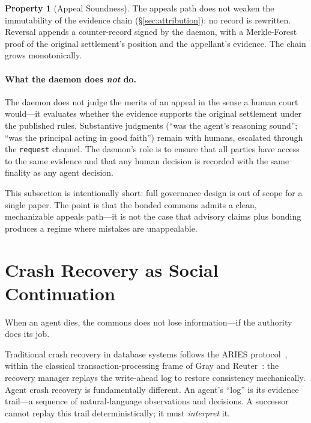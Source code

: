 \documentclass[11pt,a4paper]{article}
\theoremstyle{definition}
\newtheorem{property}{Property}[section]
\theoremstyle{remark}
\begin{document}
\begin{property}[Appeal Soundness]\label{prop:appeal-sound}
The appeals path does not weaken the immutability of the evidence chain (\S\ref{sec:attribution}): no record is rewritten. Reversal appends a counter-record signed by the daemon, with a Merkle-Forest proof of the original settlement's position and the appellant's evidence. The chain grows monotonically.
\end{property}

\paragraph{What the daemon does \emph{not} do.} The daemon does not judge the merits of an appeal in the sense a human court would---it evaluates whether the evidence supports the original settlement under the published rules. Substantive judgments (``was the agent's reasoning sound''; ``was the principal acting in good faith'') remain with humans, escalated through the \texttt{request} channel. The daemon's role is to ensure that all parties have access to the same evidence and that any human decision is recorded with the same finality as any agent decision.

This subsection is intentionally short: full governance design is out of scope for a single paper. The point is that the bonded commons admits a clean, mechanizable appeals path---it is not the case that advisory claims plus bonding produces a regime where mistakes are unappealable.

\section{Crash Recovery as Social Continuation}\label{sec:crash-recovery}

When an agent dies, the commons does not lose information---if the authority does its job.

Traditional crash recovery in database systems follows the ARIES protocol~\cite{mohan1992aries}, within the classical transaction-processing frame of Gray and Reuter~\cite{gray1993transaction}: the recovery manager replays the write-ahead log to restore consistency mechanically. Agent crash recovery is fundamentally different. An agent's ``log'' is its evidence trail---a sequence of natural-language observations and decisions. A successor cannot replay this trail deterministically; it must \emph{interpret} it.
\end{document}
